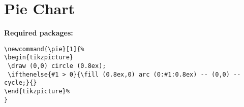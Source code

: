 \section{Pie Chart}
\noindent\textbf{Required packages: }
\begin{lstlisting}
\newcommand{\pie}[1]{%
\begin{tikzpicture}
 \draw (0,0) circle (0.8ex);
 \ifthenelse{#1 > 0}{\fill (0.8ex,0) arc (0:#1:0.8ex) -- (0,0) -- cycle;}{}
\end{tikzpicture}%
}
\end{lstlisting}